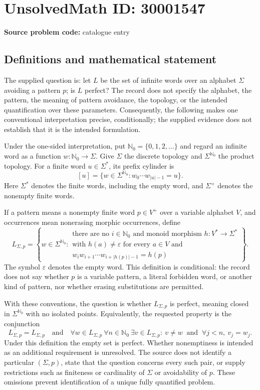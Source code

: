 \documentclass[11pt]{article}
\begin{document}
\section*{UnsolvedMath ID: 30001547}
\textbf{Source problem code:} catalogue entry
\subsection{Definitions and mathematical statement}
The supplied question is: let \(L\) be the set of infinite words over an alphabet \(\Sigma\) avoiding a pattern \(p\); is \(L\) perfect? The record does not specify the alphabet, the pattern, the meaning of pattern avoidance, the topology, or the intended quantification over these parameters. Consequently, the following makes one conventional interpretation precise, conditionally; the supplied evidence does not establish that it is the intended formulation.

Under the one-sided interpretation, put \(\mathbb N_0=\{0,1,2,\ldots\}\) and regard an infinite word as a function \(w:\mathbb N_0\to\Sigma\). Give \(\Sigma\) the discrete topology and \(\Sigma^{\mathbb N_0}\) the product topology. For a finite word \(u\in\Sigma^*\), its prefix cylinder is
\[
[u]=\{w\in\Sigma^{\mathbb N_0}:w_0\cdots w_{|u|-1}=u\}.
\]
Here \(\Sigma^*\) denotes the finite words, including the empty word, and \(\Sigma^+\) denotes the nonempty finite words.

If a pattern means a nonempty finite word \(p\in V^+\) over a variable alphabet \(V\), and occurrences mean nonerasing morphic occurrences, define
\[
L_{\Sigma,p}=\left\{w\in\Sigma^{\mathbb N_0}:\begin{array}{l}
\text{there are no }i\in\mathbb N_0\text{ and monoid morphism }h:V^*\to\Sigma^*\\
\text{with }h(a)\ne\varepsilon\text{ for every }a\in V\text{ and}\\
w_iw_{i+1}\cdots w_{i+|h(p)|-1}=h(p)
\end{array}\right\}.
\]
The symbol \(\varepsilon\) denotes the empty word. This definition is conditional: the record does not say whether \(p\) is a variable pattern, a literal forbidden word, or another kind of pattern, nor whether erasing substitutions are permitted.

With these conventions, the question is whether \(L_{\Sigma,p}\) is perfect, meaning closed in \(\Sigma^{\mathbb N_0}\) with no isolated points. Equivalently, the requested property is the conjunction
\[
\overline{L_{\Sigma,p}}=L_{\Sigma,p}
\quad\text{and}\quad
\forall w\in L_{\Sigma,p}\ \forall n\in\mathbb N_0\ \exists v\in L_{\Sigma,p}:
\ v\ne w\ \text{ and }\ \forall j<n,\ v_j=w_j.
\]
Under this definition the empty set is perfect. Whether nonemptiness is intended as an additional requirement is unresolved. The source does not identify a particular \((\Sigma,p)\), state that the question concerns every such pair, or supply restrictions such as finiteness or cardinality of \(\Sigma\) or avoidability of \(p\). These omissions prevent identification of a unique fully quantified problem.
\end{document}
